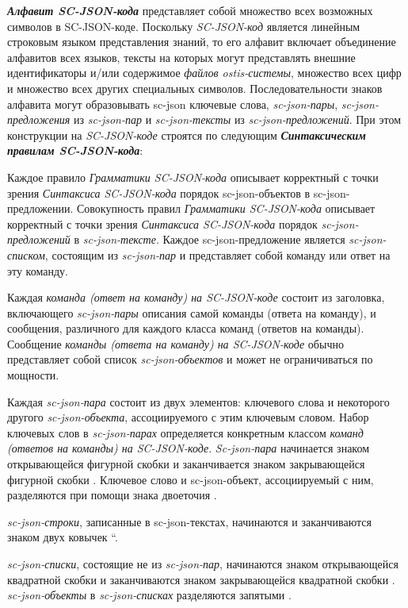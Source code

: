 \textbf{\textit{Алфавит SC-JSON-кода\scnsupergroupsign}} представляет собой множество всех возможных символов в SC-JSON-коде. Поскольку \textit{SC-JSON-код} является линейным строковым языком представления знаний, то его алфавит включает объединение алфавитов всех языков, тексты на которых могут представлять внешние идентификаторы и/или содержимое \textit{файлов ostis-системы}, множество всех цифр и множество всех других специальных символов. Последовательности знаков алфавита могут образовывать sc-json ключевые слова, \textit{sc-json-пары}, \textit{sc-json-предложения} из \textit{sc-json-пар} и \textit{sc-json-тексты} из \textit{sc-json-предложений}. При этом конструкции на \textit{SC-JSON-коде} строятся по следующим \textbf{\textit{Синтаксическим правилам SC-JSON-кода}}:
\begin{textitemize}
    \item Каждое правило \textit{Грамматики SC-JSON-кода} описывает корректный с точки зрения \textit{Синтаксиса SC-JSON-кода} порядок sc-json-объектов в sc-json-предложении. Совокупность правил \textit{Грамматики SC-JSON-кода} описывает корректный с точки зрения \textit{Синтаксиса SC-JSON-кода} порядок \textit{sc-json-предложений} в \textit{sc-json-тексте}. Каждое sc-json-предложение является \textit{sc-json-списком}, состоящим из \textit{sc-json-пар} и представляет собой команду или ответ на эту команду.
    \item Каждая \textit{команда (ответ на команду) на SC-JSON-коде} состоит из заголовка, включающего \textit{sc-json-пары} описания самой команды (ответа на команду), и сообщения, различного для каждого класса команд (ответов на команды). Сообщение \textit{команды (ответа на команду) на SC-JSON-коде} обычно представляет собой список \textit{sc-json-объектов} и может не ограничиваться по мощности.
    \item Каждая \textit{sc-json-пара} состоит из двух элементов: ключевого слова и некоторого другого \textit{sc-json-объекта}, ассоциируемого с этим ключевым словом. Набор ключевых слов в \textit{sc-json-парах} определяется конкретным классом \textit{команд (ответов на команды) на SC-JSON-коде}. \textit{Sc-json-пара} начинается знаком открывающейся фигурной скобки \scnqq{\{} и заканчивается знаком закрывающейся фигурной скобки \scnqq{\}}. Ключевое слово и sc-json-объект, ассоциируемый с ним, разделяются при помощи знака двоеточия \scnqq{:}.
    \item \textit{sc-json-строки}, записанные в sc-json-текстах, начинаются и заканчиваются знаком двух ковычек \textquotedblleft.
    \item \textit{sc-json-списки}, состоящие не из \textit{sc-json-пар}, начинаются знаком открывающейся квадратной скобки \scnqq{[} и заканчиваются знаком закрывающейся квадратной скобки \scnqq{]}. \textit{sc-json-объекты} в \textit{sc-json-списках} разделяются запятыми \scnqq{,}.
\end{textitemize}

